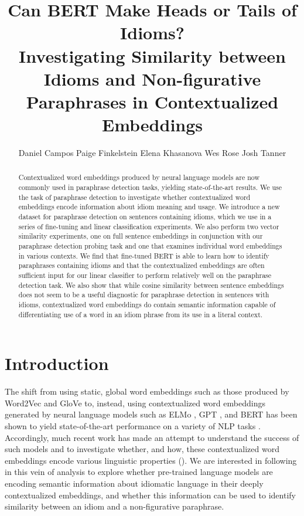 \documentclass[11pt,a4paper]{article}
\title{Can BERT Make Heads or Tails of Idioms? \\ Investigating Similarity between Idioms and Non-figurative Paraphrases in Contextualized Embeddings}
\author{Daniel Campos \And
  Paige Finkelstein \And 
    Elena Khasanova  \And
  Wes Rose  \And
  Josh Tanner }
\begin{document}
\maketitle
\begin{abstract}
Contextualized word embeddings produced by neural language models are now commonly used in paraphrase detection tasks, yielding state-of-the-art results. We use the task of paraphrase detection to investigate whether contextualized word embeddings encode information about idiom meaning and usage. We introduce a new dataset for paraphrase detection on sentences containing idioms, which we use in a series of fine-tuning and linear classification experiments. We also perform two vector similarity experiments, one on full sentence embeddings in conjunction with our paraphrase detection probing task and one that examines individual word embeddings in various contexts. We find that fine-tuned BERT is able to learn how to identify paraphrases containing idioms and that the contextualized embeddings are often sufficient input for our linear classifier to perform relatively well on the paraphrase detection task. We also show that while cosine similarity between sentence embeddings does not seem to be a useful diagnostic for paraphrase detection in sentences with idioms, contextualized word embeddings do contain semantic information capable of differentiating use of a word in an idiom phrase from its use in a literal context.
\end{abstract}


\section{Introduction}

The shift from using static, global word embeddings such as those produced by Word2Vec \cite{mikolov2013distributed} and GloVe \cite{Pennington2014GloveGV} to, instead, using contextualized word embeddings generated by neural language models such as ELMo \cite{Peters2018DeepCW}, GPT \cite{Radford2018ImprovingLU}, and BERT \cite{devlin2018bert} has been shown to yield state-of-the-art performance on a variety of NLP tasks \cite{devlin2018bert}. Accordingly, much recent work has made an attempt to understand the success of such models and to investigate whether, and how, these contextualized word embeddings encode various linguistic properties (\citet{Belinkov_2019}). We are interested in following in this vein of analysis to explore whether pre-trained language models are encoding semantic information about idiomatic language in their deeply contextualized embeddings, and whether this information can be used to identify similarity between an idiom and a non-figurative paraphrase. 
\end{document}
